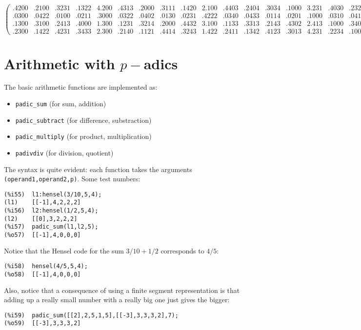 \documentclass[fleqn]{cas-sc}
\begin{document}
\begin{sideways}
\begin{minipage}{\textheight}
\[\begin{pmatrix}
.4200 & .2100 & .3231 & .1322 & 4.200 & .4313 & .2000 & .3111 & .1420 & 2.100 & .4403 & .2404 & .3034 & .1000 & 3.231 & .4030 & .2323\\
.0300 & .0422 & .0100 & .0211 & .3000 & .0322 & .0402 & .0130 & .0231 & .4222 & .0340 & .0433 & .0114 & .0201 & .1000 & .0310 & .0412\\
.1300 & .3100 & .2413 & .4000 & 1.300 & .1231 & .3214 & .2000 & .4432 & 3.100 & .1133 & .3313 & .2143 & .4302 & 2.413 & .1000 & .3401\\
.2300 & .1422 & .4231 & .3433 & 2.300 & .2140 & .1121 & .4414 & .3243 & 1.422 & .2411 & .1342 & .4123 & .3013 & 4.231 & .2234 & .1000
\end{pmatrix}
\]
\end{minipage}
\end{sideways}


\section{Arithmetic with $p-$adics}\label{sec4}

\noindent The basic arithmetic functions are implemented as:
\begin{itemize}
	\item  \texttt{padic\_sum} (for sum, addition)
	\item  \texttt{padic\_subtract} (for difference, substraction)
	\item  \texttt{padic\_multiply} (for product, multiplication)
	\item  \texttt{padivdiv} (for division, quotient)
\end{itemize}

The syntax is quite evident: each function takes the arguments
\texttt{(operand1,operand2,p)}.
Some test numbers:
\begin{verbatim}
(%i55)	l1:hensel(3/10,5,4);
(l1)	[[-1],4,2,2,2]
(%i56)	l2:hensel(1/2,5,4);
(l2)	[[0],3,2,2,2]
(%i57)	padic_sum(l1,l2,5);
(%o57)	[[-1],4,0,0,0]
\end{verbatim}

Notice that the Hensel code for the sum $3/10+1/2$ corresponds to $4/5$:
\begin{verbatim}
(%i58)	hensel(4/5,5,4);
(%o58)	[[-1],4,0,0,0]
\end{verbatim}

Also, notice that a consequence of using a finite segment representation is that
adding up a really small number with a really big one just gives the bigger:
\begin{verbatim}
(%i59)	padic_sum([[2],2,5,1,5],[[-3],3,3,3,2],7);
(%o59)	[[-3],3,3,3,2]
\end{verbatim}
\end{document}
